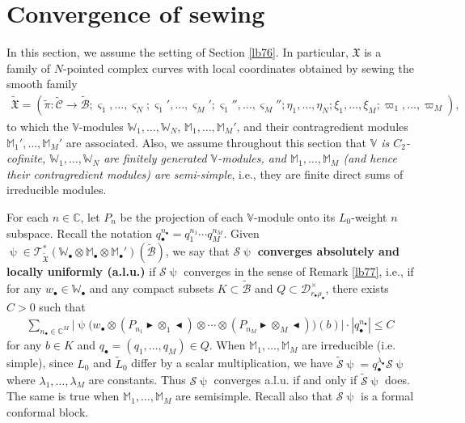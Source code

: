 \documentclass[12pt,b5paper,notitlepage]{report}
\theoremstyle{definition}
\theoremstyle{plain}
\newcommand{\fk}{\mathfrak}
\newcommand{\mc}{\mathcal}
\newcommand{\wtd}{\widetilde}
\newcommand{\scr}{\mathscr}
\newcommand{\sgm}{\varsigma}
\newcommand{\blt}{\bullet}
\newcommand{\Vbb}{\mathbb V}
\newcommand{\Wbb}{\mathbb W}
\newcommand{\Mbb}{\mathbb M}
\newcommand{\Cbb}{\mathbb C}
\newcommand{\btl}{\blacktriangleleft}
\newcommand{\btr}{\blacktriangleright}
\numberwithin{equation}{section}
\begin{document}
\section{Convergence of sewing}\label{lb147}


In this section, we assume the setting of Section \ref{lb76}. In particular, $\fk X$ is a family of $N$-pointed complex curves with local coordinates obtained by sewing the smooth family
\begin{align*}
\wtd{\fk X}=(\wtd\pi:\wtd{\mc C}\rightarrow\wtd{\mc B};\sgm_1,\dots,\sgm_N;\sgm_1',\dots,\sgm_M';\sgm_1'',\dots,\sgm_M'';\eta_1,\dots,\eta_N;\xi_1,\dots,\xi_M;\varpi_1,\dots,\varpi_M),
\end{align*}
to which the $\Vbb$-modules $\Wbb_1,\dots,\Wbb_N$, $\Mbb_1,\dots,\Mbb_M'$, and their contragredient modules $\Mbb_1',\dots,\Mbb_M'$ are associated.  Also, we assume throughout this section that \emph{$\Vbb$ is $C_2$-cofinite,  $\Wbb_1,\dots,\Wbb_N$ are finitely generated $\Vbb$-modules, and $\Mbb_1,\dots,\Mbb_M$ (and hence their contragredient modules) are semi-simple}, i.e., they are finite direct sums of irreducible modules. 


For each $n\in\Cbb$, let $P_n$ be the projection of each $\Vbb$-module onto its $L_0$-weight $n$ subspace. Recall the notation $q_\blt^{n_\blt}=q_1^{n_1}\cdots q_M^{n_M}$. Given $\uppsi\in\scr T_{\wtd{\fk X}}^*(\Wbb_\blt\otimes\Mbb_\blt\otimes\Mbb_\blt')(\wtd{\mc B})$, we say that $\mc S\uppsi$ \textbf{converges absolutely and locally uniformly (a.l.u.)} if $\mc S\uppsi$ converges in the sense of Remark \ref{lb77}, i.e., if for any $w_\blt\in\Wbb_\blt$ and any compact subsets $K\subset\wtd{\mc B}$ and $Q\subset\mc D_{r_\blt\rho_\blt}^\times$, there exists $C>0$ such that
\begin{align*}
\sum_{n_\blt\in\Cbb^M}\Big|\uppsi\Big(w_\blt\otimes (P_{n_1}\btr\otimes_1\btl)\otimes\cdots\otimes (P_{n_M}\btr\otimes_M\btl)\Big)(b)   \Big|\cdot |q_\blt^{n_\blt}|\leq C
\end{align*}
for any $b\in K$ and $q_\blt=(q_1,\dots,q_M)\in Q$. When $\Mbb_1,\dots,\Mbb_M$ are irreducible (i.e. simple), since $L_0$ and $\wtd L_0$ differ by a scalar multiplication, we have $\wtd{\mc S}\uppsi=q_\blt^{\lambda_\blt}\mc S\uppsi$  where $\lambda_1,\dots,\lambda_M$ are constants. Thus $\mc S\uppsi$ converges a.l.u. if and only if $\wtd{\mc S}\uppsi$ does. The same is true when $\Mbb_1,\dots,\Mbb_M$ are semisimple. Recall also that $\mc S\uppsi$ is a formal conformal block.
\end{document}
